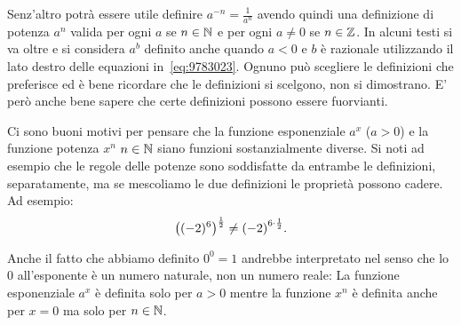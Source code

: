 Senz'altro potrà essere utile definire 
$a^{-n} = \frac 1 {a^n}$ avendo quindi una definizione 
di potenza $a^n$ valida per ogni $a$ se $n\in {\mathbb N}$ 
e per ogni $a\neq 0$ se $n\in {\mathbb Z}$.
In alcuni testi si va oltre e si considera $a^b$ 
definito anche quando $a<0$ e $b$ è razionale
utilizzando il lato destro delle equazioni 
in~\eqref{eq:9783023}.
Ognuno può scegliere le definizioni che preferisce 
ed è bene ricordare che le definizioni si scelgono, 
non si dimostrano. 
E' però anche bene sapere che certe definizioni 
possono essere fuorvianti.

Ci sono buoni motivi per pensare che la funzione 
esponenziale $a^x$ ($a>0$) e la funzione potenza $x^n$ 
$n\in {\mathbb N}$ siano funzioni sostanzialmente diverse.
Si noti ad esempio che le regole delle potenze sono 
soddisfatte da entrambe le definizioni, separatamente, 
ma se mescoliamo le due definizioni le proprietà 
possono cadere. Ad esempio:
\[
  {\left( (-2)^6 \right)}^{\frac 1 2} 
  \neq {\left( -2 \right)}^{6\cdot \frac 1 2}.
\]

Anche il fatto che abbiamo definito $0^0=1$ andrebbe 
interpretato nel senso che lo $0$ all'esponente 
è un numero naturale, non un numero reale:
La funzione esponenziale $a^x$ è definita 
solo per $a>0$ mentre la funzione $x^n$ è definita anche 
per $x=0$ ma solo per $n\in {\mathbb N}$.




